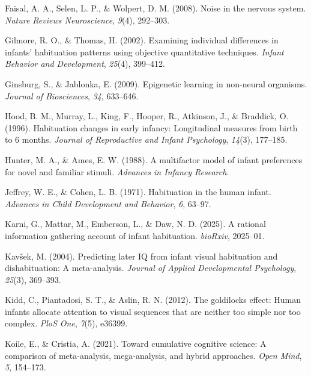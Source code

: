 \documentclass[10pt, letterpaper]{article}
\newenvironment{CSLReferences}%
  {}%
  {\par}
\begin{document}
\begin{CSLReferences}{1}{0}
\leavevmode{}%
Faisal, A. A., Selen, L. P., \& Wolpert, D. M. (2008). Noise in the
nervous system. \emph{Nature Reviews Neuroscience}, \emph{9}(4),
292--303.

\leavevmode{}%
Gilmore, R. O., \& Thomas, H. (2002). Examining individual differences
in infants' habituation patterns using objective quantitative
techniques. \emph{Infant Behavior and Development}, \emph{25}(4),
399--412.

\leavevmode{}%
Ginsburg, S., \& Jablonka, E. (2009). Epigenetic learning in non-neural
organisms. \emph{Journal of Biosciences}, \emph{34}, 633--646.

\leavevmode{}%
Hood, B. M., Murray, L., King, F., Hooper, R., Atkinson, J., \&
Braddick, O. (1996). Habituation changes in early infancy: Longitudinal
measures from birth to 6 months. \emph{Journal of Reproductive and
Infant Psychology}, \emph{14}(3), 177--185.

\leavevmode{}%
Hunter, M. A., \& Ames, E. W. (1988). A multifactor model of infant
preferences for novel and familiar stimuli. \emph{Advances in Infancy
Research}.

\leavevmode{}%
Jeffrey, W. E., \& Cohen, L. B. (1971). Habituation in the human infant.
\emph{Advances in Child Development and Behavior}, \emph{6}, 63--97.

\leavevmode{}%
Karni, G., Mattar, M., Emberson, L., \& Daw, N. D. (2025). A rational
information gathering account of infant habituation. \emph{bioRxiv},
2025--01.

\leavevmode{}%
Kavšek, M. (2004). Predicting later IQ from infant visual habituation
and dishabituation: A meta-analysis. \emph{Journal of Applied
Developmental Psychology}, \emph{25}(3), 369--393.

\leavevmode{}%
Kidd, C., Piantadosi, S. T., \& Aslin, R. N. (2012). The goldilocks
effect: Human infants allocate attention to visual sequences that are
neither too simple nor too complex. \emph{PloS One}, \emph{7}(5),
e36399.

\leavevmode{}%
Koile, E., \& Cristia, A. (2021). Toward cumulative cognitive science: A
comparison of meta-analysis, mega-analysis, and hybrid approaches.
\emph{Open Mind}, \emph{5}, 154--173.


\end{CSLReferences}
\end{document}
